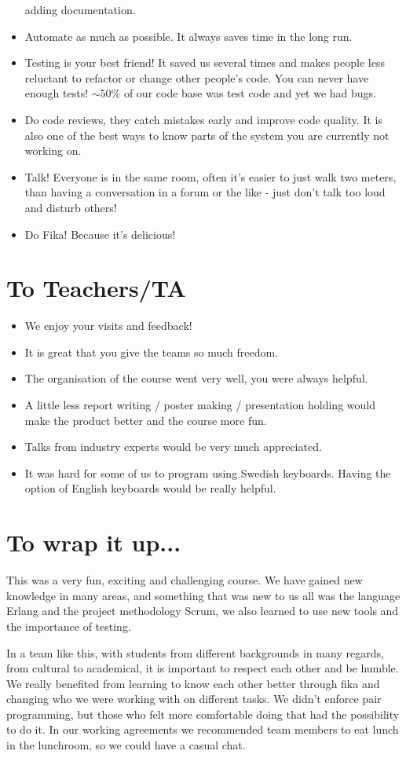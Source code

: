 \documentclass[11pt,a4paper]{report}
\begin{document}
\begin{itemize}
  adding documentation.
\item Automate as much as possible. It always saves time in the long run.
\item Testing is your best friend!
      It saved us several times and makes people less reluctant to refactor
      or change other people's code.
      You can never have enough tests!
      $\sim 50\%$ of our code base was test code and yet we had bugs.
\item Do code reviews, they catch mistakes early and improve code quality.
      It is also one of the best ways to know parts of the system you are
      currently not working on.
\item Talk! Everyone is in the same room, often it's easier to just walk two
      meters, than having a conversation in a forum or the like -
      just don't talk too loud and disturb others!
\item Do Fika! Because it's delicious!
\end{itemize}
\section*{To Teachers/TA}
\begin{itemize}
\item We enjoy your visits and feedback!
\item It is great that you give the teams so much freedom.
\item The organisation of the course went very well, you were always helpful.
\item A little less report writing / poster making / presentation holding would
  make the product better and the course more fun.
\item Talks from industry experts would be very much appreciated.
\item It was hard for some of us to program using Swedish keyboards. Having
the option of English keyboards would be really helpful.
\end{itemize}


\section*{To wrap it up...}
This was a very fun, exciting and challenging course. We have gained new
knowledge in many areas, and something that was new to us all was the
language Erlang and the project methodology Scrum, we also learned to
use new tools and the importance of testing.

In a team like this, with students from different backgrounds in many regards,
from cultural to academical, it is important to respect each other and be
humble.  We really benefited from learning to know each other better through
fika and changing who we were working with on different tasks. We didn't enforce
pair programming, but those who felt more comfortable doing that had the
possibility to do it. In our working agreements we recommended team members to
eat lunch in the lunchroom, so we could have a casual chat.
\end{document}
